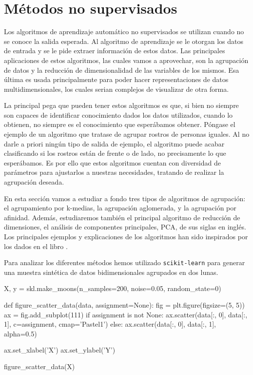 \section{Métodos no supervisados}

Los algoritmos de aprendizaje automático no supervisados se utilizan cuando no se conoce la salida esperada. Al algoritmo de aprendizaje se le otorgan los datos de entrada y se le pide extraer información de estos datos. Las principales aplicaciones de estos algoritmos, las cuales vamos a aprovechar, son la agrupación de datos y la reducción de dimensionalidad de las variables de los mismos. Esa última es usada principalmente para poder hacer representaciones de datos multidimensionales, los cuales serian complejos de visualizar de otra forma.

La principal pega que pueden tener estos algoritmos es que, si bien no siempre son capaces de identificar conocimiento dados los datos utilizados, cuando lo obtienen, no siempre es el conocimiento que esperábamos obtener. Póngase el ejemplo de un algoritmo que tratase de agrupar rostros de personas iguales. Al no darle a priori ningún tipo de salida de ejemplo, el algoritmo puede acabar clasificando si los rostros están de frente o de lado, no precisamente lo que esperábamos. Es por ello que estos algoritmos cuentan con diversidad de parámetros para ajustarlos a nuestras necesidades, tratando de realizar la agrupación deseada.

En esta sección vamos a estudiar a fondo tres tipos de algoritmos de agrupación: el agrupamiento por k-medias, la agrupación aglomerada, y la agrupación por afinidad. Además, estudiaremos también el principal algoritmo de reducción de dimensiones, el análisis de componentes principales, PCA, de sus siglas en inglés. Los principales ejemplos y explicaciones de los algoritmos han sido inspirados por los dados en el libro \cite[Introduction to Machine Learning with Python]{machine}.

Para analizar los diferentes métodos hemos utilizado \texttt{scikit-learn} para generar una muestra sintética de datos bidimensionales agrupados en dos lunas.

\begin{mypython}[float={h},caption={Generación de datos sinteticos.}]
    X, y = skl.make_moons(n_samples=200,
                          noise=0.05,
                          random_state=0)
    
    def figure_scatter_data(data, assignment=None):
      fig = plt.figure(figsize=(5, 5))
      ax = fig.add_subplot(111)  
      if assignment is not None:
        ax.scatter(data[:, 0], data[:, 1], c=assignment, cmap='Pastel1')
      else:
        ax.scatter(data[:, 0], data[:, 1], alpha=0.5)

      ax.set_xlabel('X')
      ax.set_ylabel('Y')  

    figure_scatter_data(X)
\end{mypython}

